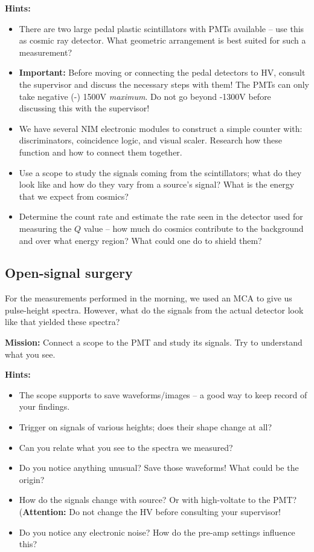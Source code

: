 \documentclass[a4,11pt, notitlepage]{article}
\begin{document}
\textbf{Hints:}
\begin{itemize}
\item There are two large pedal plastic scintillators with PMTs
  available -- use this as cosmic ray detector. What geometric
  arrangement is best suited for such a measurement?
\item \textbf{Important:} Before moving or connecting the pedal detectors to HV, consult
  the supervisor and discuss the necessary steps with them! The PMTs
  can only take negative (-) 1500V \emph{maximum}. Do not go beyond
  -1300V before discussing this with the supervisor!
\item We have several NIM electronic modules to construct a simple
  counter with: discriminators, coincidence logic, and visual
  scaler. Research how these function and how to connect them together.
\item Use a scope to study the signals coming from the scintillators;
  what do they look like and how do they vary from a source's signal?
  What is the energy that we expect from cosmics?
\item Determine the count rate and estimate the rate seen in the
  detector used for measuring the $Q$ value -- how much do cosmics
  contribute to the background and over what energy region? What could
  one do to shield them?
\end{itemize}

\subsection{Open-signal surgery}
\label{sec:}
For the measurements performed in the morning, we used an MCA to
give us pulse-height spectra. However, what do the signals from the
actual detector look like that yielded these spectra?

\textbf{Mission:} Connect a scope to the PMT and study its
signals. Try to understand what you see.

\textbf{Hints:}
\begin{itemize}
\item The scope supports to save waveforms/images -- a good way to
  keep record of your findings.
\item Trigger on signals of various heights; does their shape change
  at all?
\item Can you relate what you see to
the spectra we measured?
\item Do you notice anything unusual? Save those waveforms! What could
  be the origin?
\item How do the signals change with source? Or with high-voltate to the
  PMT? (\textbf{Attention:} Do not change the HV before consulting
  your supervisor!
\item Do you notice any electronic noise? How do the pre-amp settings
  influence this?
\end{itemize}
\end{document}
